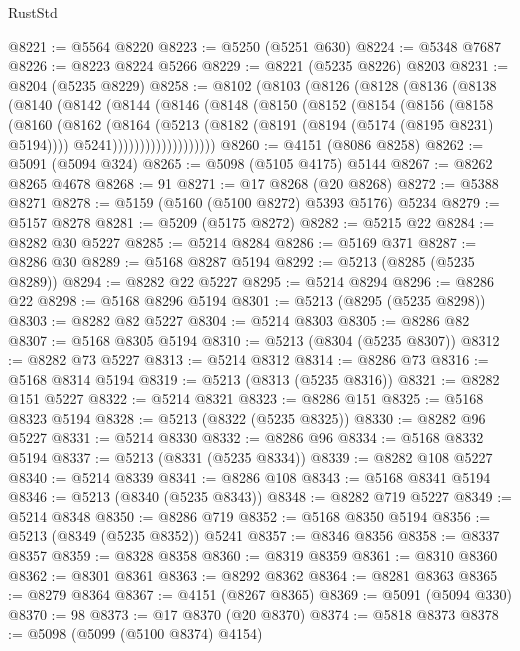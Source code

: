 \begin{lexlean}{RustStd}
\begin{coremodule}
@8221 := @5564 @8220
@8223 := @5250 (@5251 @630)
@8224 := @5348 @7687
@8226 := @8223 @8224 @5266
@8229 := @8221 (@5235 @8226) @8203
@8231 := @8204 (@5235 @8229)
@8258 := @8102
    (@8103
      (@8126
        (@8128
          (@8136
            (@8138
              (@8140
                (@8142
                  (@8144
                    (@8146
                      (@8148
                        (@8150
                          (@8152
                            (@8154
                              (@8156
                                (@8158
                                  (@8160
                                    (@8162
                                      (@8164
                                        (@5213
                                          (@8182 (@8191 (@8194 (@5174 (@8195 @8231) @5194))))
                                          @5241)))))))))))))))))))
@8260 := @4151 (@8086 @8258)
@8262 := @5091 (@5094 @324)
@8265 := @5098 (@5105 @4175) @5144
@8267 := @8262 @8265 @4678
@8268 := 91
@8271 := @17 @8268 (@20 @8268)
@8272 := @5388 @8271
@8278 := @5159 (@5160 (@5100 @8272) @5393 @5176) @5234
@8279 := @5157 @8278
@8281 := @5209 (@5175 @8272)
@8282 := @5215 @22
@8284 := @8282 @30 @5227
@8285 := @5214 @8284
@8286 := @5169 @371
@8287 := @8286 @30
@8289 := @5168 @8287 @5194
@8292 := @5213 (@8285 (@5235 @8289))
@8294 := @8282 @22 @5227
@8295 := @5214 @8294
@8296 := @8286 @22
@8298 := @5168 @8296 @5194
@8301 := @5213 (@8295 (@5235 @8298))
@8303 := @8282 @82 @5227
@8304 := @5214 @8303
@8305 := @8286 @82
@8307 := @5168 @8305 @5194
@8310 := @5213 (@8304 (@5235 @8307))
@8312 := @8282 @73 @5227
@8313 := @5214 @8312
@8314 := @8286 @73
@8316 := @5168 @8314 @5194
@8319 := @5213 (@8313 (@5235 @8316))
@8321 := @8282 @151 @5227
@8322 := @5214 @8321
@8323 := @8286 @151
@8325 := @5168 @8323 @5194
@8328 := @5213 (@8322 (@5235 @8325))
@8330 := @8282 @96 @5227
@8331 := @5214 @8330
@8332 := @8286 @96
@8334 := @5168 @8332 @5194
@8337 := @5213 (@8331 (@5235 @8334))
@8339 := @8282 @108 @5227
@8340 := @5214 @8339
@8341 := @8286 @108
@8343 := @5168 @8341 @5194
@8346 := @5213 (@8340 (@5235 @8343))
@8348 := @8282 @719 @5227
@8349 := @5214 @8348
@8350 := @8286 @719
@8352 := @5168 @8350 @5194
@8356 := @5213 (@8349 (@5235 @8352)) @5241
@8357 := @8346 @8356
@8358 := @8337 @8357
@8359 := @8328 @8358
@8360 := @8319 @8359
@8361 := @8310 @8360
@8362 := @8301 @8361
@8363 := @8292 @8362
@8364 := @8281 @8363
@8365 := @8279 @8364
@8367 := @4151 (@8267 @8365)
@8369 := @5091 (@5094 @330)
@8370 := 98
@8373 := @17 @8370 (@20 @8370)
@8374 := @5818 @8373
@8378 := @5098 (@5099 (@5100 @8374) @4154)

\end{coremodule}
\end{lexlean}
